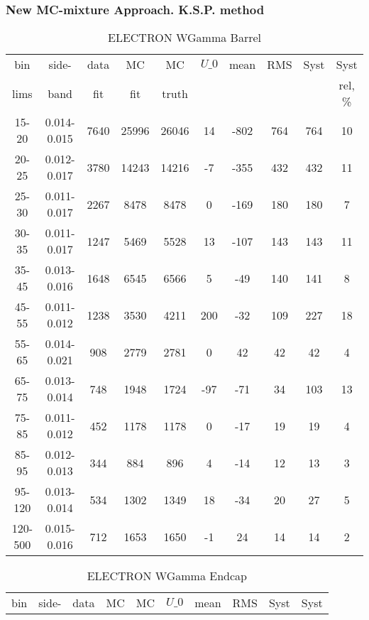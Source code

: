 \documentclass{beamer}
\begin{document}
\begin{frame}\frametitle{New MC-mixture Approach. K.S.P. method}
\begin{table}[h]
  	\tiny
  \begin{center}
  \caption{ELECTRON WGamma Barrel}
  \begin{tabular}{|c|c|c|c|c|c|c|c|c|c|}
    bin & side- & data & MC & MC    & $U\_{0}$ & mean & RMS & Syst & Syst \\ 
    lims & band & fit & fit & truth &       &      &     &      & rel, \% \\ \hline
    15-20 & 0.014-0.015 & 7640 & 25996 & 26046 & 14 & -802 & 764 & 764 & 10  \\ \hline
    20-25 & 0.012-0.017 & 3780 & 14243 & 14216 & -7 & -355 & 432 & 432 & 11  \\ \hline
    25-30 & 0.011-0.017 & 2267 & 8478 & 8478 & 0 & -169 & 180 & 180 & 7  \\ \hline
    30-35 & 0.011-0.017 & 1247 & 5469 & 5528 & 13 & -107 & 143 & 143 & 11  \\ \hline
    35-45 & 0.013-0.016 & 1648 & 6545 & 6566 & 5 & -49 & 140 & 141 & 8  \\ \hline
    45-55 & 0.011-0.012 & 1238 & 3530 & 4211 & 200 & -32 & 109 & 227 & 18  \\ \hline
    55-65 & 0.014-0.021 & 908 & 2779 & 2781 & 0 & 42 & 42 & 42 & 4  \\ \hline
    65-75 & 0.013-0.014 & 748 & 1948 & 1724 & -97 & -71 & 34 & 103 & 13  \\ \hline
    75-85 & 0.011-0.012 & 452 & 1178 & 1178 & 0 & -17 & 19 & 19 & 4  \\ \hline
    85-95 & 0.012-0.013 & 344 & 884 & 896 & 4 & -14 & 12 & 13 & 3  \\ \hline
    95-120 & 0.013-0.014 & 534 & 1302 & 1349 & 18 & -34 & 20 & 27 & 5  \\ \hline
    120-500 & 0.015-0.016 & 712 & 1653 & 1650 & -1 & 24 & 14 & 14 & 2  \\ \hline
  \end{tabular}
  \label{tab:systSbVar_Meth1_ELECTRON_WGamma_Barrel}
  \end{center}
\end{table}
\begin{table}[h]
  	\tiny
  \begin{center}
  \caption{ELECTRON WGamma Endcap}
  \begin{tabular}{|c|c|c|c|c|c|c|c|c|c|}
    bin & side- & data & MC & MC    & $U\_{0}$ & mean & RMS & Syst & Syst \\ 

\end{tabular}
\end{center}
\end{table}
\end{frame}
\end{document}
